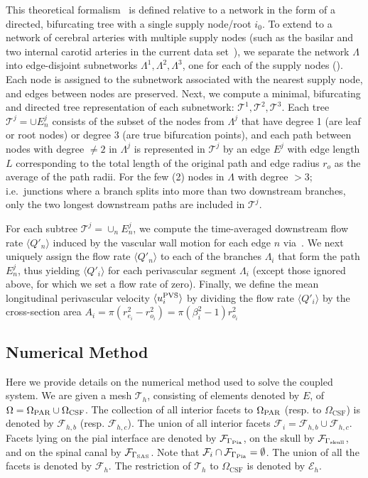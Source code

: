 \documentclass[fleqn,10pt]{wlscirep}
\newcommand{\brain}{\Omega_{\rm{PAR}}}
\newcommand{\sas}{\Omega_{\rm CSF}}
\newcommand{\pia}{\Gamma_{\rm{Pia}}}
\newcommand{\spinal}{\Gamma_{\rm SAS}}
\newcommand{\skull}{\Gamma_{\rm{skull}}}
\begin{document}

This theoretical formalism~\cite{gjerde2023directional} is defined
relative to a network in the form of a directed, bifurcating tree with
a single supply node/root $i_0$. To extend to a network of cerebral
arteries with multiple supply nodes (such as the basilar and two
internal carotid arteries in the current data
set~\cite{hodneland2019new}), we separate the network $\Lambda$ into
edge-disjoint subnetworks $\Lambda^1, \Lambda^2, \Lambda^3$, one for
each of the supply nodes (). Each node is assigned to the subnetwork associated with the nearest supply node, and edges between nodes are preserved. Next, we compute a minimal, bifurcating and directed tree representation of each subnetwork: $\mathcal{T}^1, \mathcal{T}^2, \mathcal{T}^3$. Each tree $\mathcal{T}^j = \cup E_n^j$ consists of the subset of the nodes from $\Lambda^j$ that have degree 1 (are leaf or root nodes) or degree $3$ (are true bifurcation points), and each path between nodes with degree $\not = 2$ in $\Lambda^j$ is represented in $\mathcal{T}^j$ by an edge $E^j$ with edge length $L$ corresponding to the total length of the original path and edge radius $r_o$ as the average of the path radii. For the few (2) nodes in $\Lambda$ with degree $>3$; i.e.~junctions where a branch splits into more than two downstream branches, only the two longest downstream paths are included in $\mathcal{T}^j$.

For each subtree $\mathcal{T}^j = \cup_n E_n^j$, we compute the
time-averaged downstream flow rate $\langle Q'_n \rangle$ induced by
the vascular wall motion for each edge $n$ via~\cite[eq.~(5),
  (34)]{gjerde2023directional}. We next uniquely assign the flow rate
$\langle Q'_n \rangle$ to each of the branches $\Lambda_i$ that form
the path $E_n^j$, thus yielding $\langle Q'_i \rangle$ for each
perivascular segment $\Lambda_i$ (except those ignored above, for
which we set a flow rate of zero). Finally, we define the mean
longitudinal perivascular velocity $\langle u^{\rm PVS}_i \rangle$ by
dividing the flow rate $\langle Q'_i \rangle$ by the cross-section
area $A_i = \pi (r_{e_i}^2 - r_{o_i}^2) = \pi (\beta_i^2 - 1) r_{o_i}^2$


\subsection{Numerical Method} \label{sec:details_numerical_method}
Here we provide details on the numerical method used to solve the coupled system. We are given a mesh $\mathcal{T}_h $, consisting of elements denoted by $E$, of $\Omega= \brain \cup \sas$.  The collection of all interior facets to $\Omega_{\rm PAR}$ (resp.  to $\Omega_{\mathrm{CSF}}$) is  denoted by $\mathcal{F}_{h,b}$ (resp. $\mathcal{F}_{h,c}$).  The union of all interior facets $\mathcal{F}_i = \mathcal{F}_{h,b} \cup \mathcal{F}_{h,c}$. Facets lying on the pial interface are denoted by $\mathcal{F}_{\pia}$, on the skull by $\mathcal{F}_{\skull}$, and on the spinal canal by $\mathcal{F}_{\spinal}$. Note that $\mathcal{F}_i \cap \mathcal{F}_{\pia} = \emptyset $. The union of all the facets is denoted by $\mathcal{F}_h$. The restriction of $\mathcal{T}_h $ to $\Omega_{\mathrm{CSF}}$ is denoted by $\mathcal{E}_{h}$. 
\end{document}
